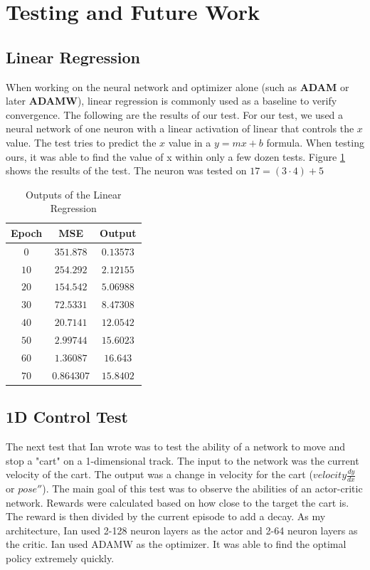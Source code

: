 \section*{Testing and Future Work}

\subsection*{Linear Regression}

When working on the neural network and optimizer alone (such as \textbf{ADAM} or later \textbf{ADAMW}), linear regression is commonly used as a baseline to verify convergence. The following are the results of our test. For our test, we used a neural network of one neuron with a linear activation of linear that controls the $x$ value. The test tries to predict the $x$ value in a $y = mx +  b$ formula. When testing ours, it was able to find the value of x within only a few dozen tests. Figure \ref{table} shows the results of the test. The neuron was tested on $17 = (3 \cdot 4)  + 5$

\begin{center} \begin{table}[!h] \centering \begin{tabular}{|c|c|c|} \hline \textbf{Epoch} & \textbf{MSE} & \textbf{Output} 
\\ \hline $0$ & $351.878$ & $0.13573$
\\ \hline $10$ & $254.292$ & $2.12155$
\\ \hline $20$ & $154.542$ & $5.06988$
\\ \hline $30$ & $72.5331$ & $8.47308$
\\ \hline $40$ & $20.7141$ & $12.0542$
\\ \hline $50$ & $2.99744$ & $15.6023$
\\ \hline $60$ & $1.36087$ & $16.643$
\\ \hline $70$ & $0.864307$ & $15.8402$
\\ \hline \end{tabular} \caption{Outputs of the Linear Regression} \label{table} \end{table} \end{center}

\subsection*{1D Control Test}
The next test that Ian wrote was to test the ability of a network to move and stop a "cart" on a 1-dimensional track. The input to the network was the current velocity of the cart. The output was a change in velocity for the cart ($velocity \frac{dy}{dx}$ or $pose''$). The main goal of this test was to observe the abilities of an actor-critic network. Rewards were calculated based on how close to the target the cart is. The reward is then divided by the current episode to add a decay. As my architecture, Ian used 2-128 neuron layers as the actor and 2-64 neuron layers as the critic. Ian used ADAMW as the optimizer. It was able to find the optimal policy extremely quickly.

